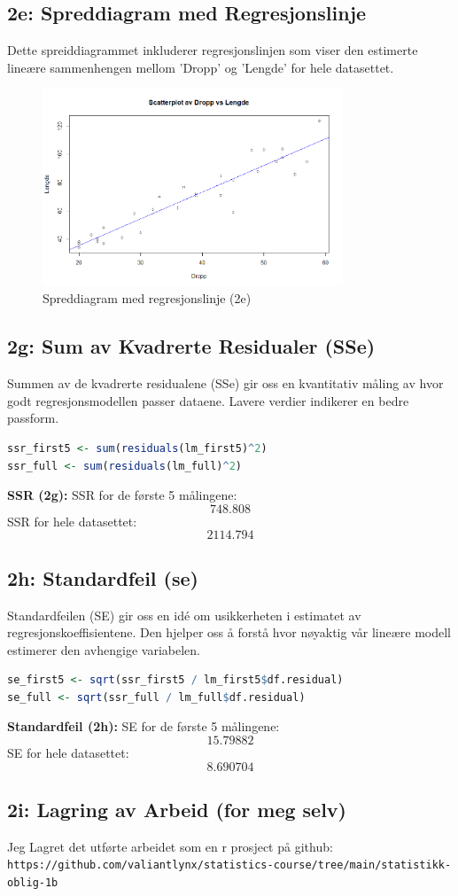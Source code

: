 \documentclass{article}
\begin{document}
\subsection{2e: Spreddiagram med Regresjonslinje}
Dette spreiddiagrammet inkluderer regresjonslinjen som viser den estimerte lineære sammenhengen mellom 'Dropp' og 'Lengde' for hele datasettet.

\begin{figure}[H]
    \centering
    \includegraphics[width=0.8\textwidth]{Rplot02.png}
    \caption{Spreddiagram med regresjonslinje (2e)}
\end{figure}

\subsection{2g: Sum av Kvadrerte Residualer (SSe)}
Summen av de kvadrerte residualene (SSe) gir oss en kvantitativ måling av hvor godt regresjonsmodellen passer dataene. Lavere verdier indikerer en bedre passform.

\begin{lstlisting}[language=R]
ssr_first5 <- sum(residuals(lm_first5)^2)
ssr_full <- sum(residuals(lm_full)^2)
\end{lstlisting}
\textbf{SSR (2g):} SSR for de første 5 målingene: \[ 748.808  \]
SSR for hele datasettet: \[ 2114.794 \]

\subsection{2h: Standardfeil (se)}
Standardfeilen (SE) gir oss en idé om usikkerheten i estimatet av regresjonskoeffisientene. Den hjelper oss å forstå hvor nøyaktig vår lineære modell estimerer den avhengige variabelen.

\begin{lstlisting}[language=R]
se_first5 <- sqrt(ssr_first5 / lm_first5$df.residual)
se_full <- sqrt(ssr_full / lm_full$df.residual)
\end{lstlisting}
\textbf{Standardfeil (2h):} SE for de første 5 målingene: \[ 15.79882 \]
SE for hele datasettet: \[ 8.690704 \]

\subsection{2i: Lagring av Arbeid (for meg selv)}
Jeg Lagret det utførte arbeidet som en r prosject på github: \\ 
\texttt{https://github.com/valiantlynx/statistics-course/tree/main/statistikk-oblig-1b}
\end{document}
